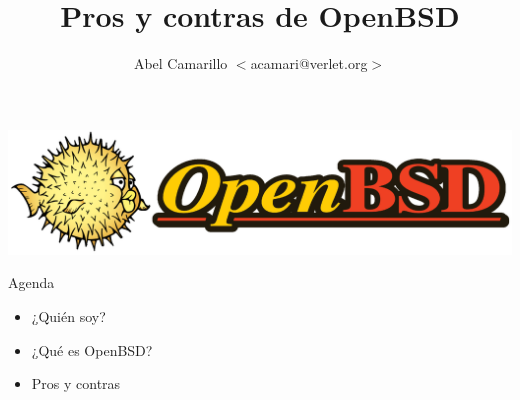 \documentclass[11pt,spanish]{article}
\title{Pros y contras de OpenBSD}
\author{Abel Camarillo $<$acamari@verlet.org$>$}
\newcommand{\rowsp}[1][1em]{\vspace{#1}}
\newcommand{\hone}[1]{{\rowsp[0.3em]\noindent\Large #1 \rowsp[0.3em]}}
\newcommand{\myitm}[1]{\begin{itemize}#1\end{itemize}}
\begin{document}
\maketitle
\thispagestyle{empty}

\begin{center}
\includegraphics[height=0.3\textheight]{img/puflogh}
\end{center}


\newpage

\hone{Agenda}

\myitm{
	\item ¿Quién soy?
	\item ¿Qué es OpenBSD?
	\item Pros y contras
}
\end{document}
